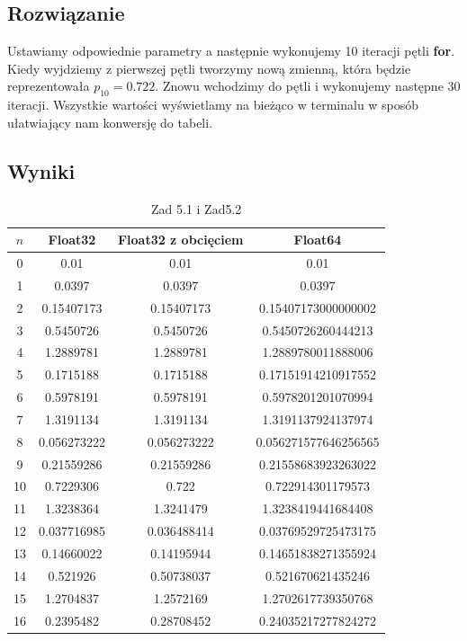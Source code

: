 \documentclass[10pt,a4paper, polish]{article}
\begin{document}
\subsection*{Rozwiązanie}
Ustawiamy odpowiednie parametry a następnie wykonujemy 10 iteracji pętli \textbf{for}. Kiedy wyjdziemy z pierwszej pętli tworzymy nową zmienną, która będzie reprezentowała $p_{10}=0.722$. Znowu wchodzimy do pętli i wykonujemy następne 30 iteracji. Wszystkie wartości wyświetlamy na bieżąco w terminalu w sposób ułatwiający nam konwersję do tabeli.
\subsection*{Wyniki}
\begin{table}[H]
\centering
\caption{Zad 5.1 i Zad5.2}
\begin{tabular}{|c|c|c|c|}
\hline
$n$ & Float32 & Float32 z obcięciem & Float64 \\
\hline
0 & 0.01 & 0.01 & 0.01 \\
\hline
1 & 0.0397 & 0.0397 & 0.0397 \\
\hline
2 & 0.15407173 & 0.15407173 & 0.15407173000000002 \\
\hline
3 & 0.5450726 & 0.5450726 & 0.5450726260444213 \\
\hline
4 & 1.2889781 & 1.2889781 & 1.2889780011888006 \\
\hline
5 & 0.1715188 & 0.1715188 & 0.17151914210917552 \\
\hline
6 & 0.5978191 & 0.5978191 & 0.5978201201070994 \\
\hline
7 & 1.3191134 & 1.3191134 & 1.3191137924137974 \\
\hline
8 & 0.056273222 & 0.056273222 & 0.056271577646256565 \\
\hline
9 & 0.21559286 & 0.21559286 & 0.21558683923263022 \\
\hline
10 & 0.7229306 & 0.722 & 0.722914301179573 \\
\hline
11 & 1.3238364 & 1.3241479 & 1.3238419441684408 \\
\hline
12 & 0.037716985 & 0.036488414 & 0.03769529725473175 \\
\hline
13 & 0.14660022 & 0.14195944 & 0.14651838271355924 \\
\hline
14 & 0.521926 & 0.50738037 & 0.521670621435246 \\
\hline
15 & 1.2704837 & 1.2572169 & 1.2702617739350768 \\
\hline
16 & 0.2395482 & 0.28708452 & 0.24035217277824272 \\

\end{tabular}
\end{table}
\end{document}
